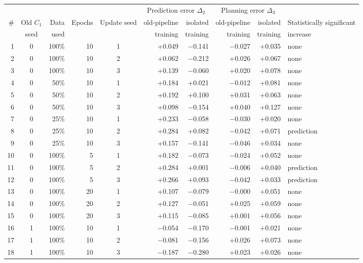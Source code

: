 \documentclass[10pt,a4paper]{article}
\newcommand{\Y}{\cellcolor{red!15}}
\begin{document}
\small
\begin{tabular}{rcrrcrrrrl}\toprule
 & & & & & \multicolumn{2}{c}{Prediction error $\Delta_2$} & \multicolumn{2}{c}{Planning error $\Delta_3$} & \\
\cmidrule(lr){6-7}\cmidrule(lr){8-9}
\# & Old $C_1$ & Data & Epochs & Update seed & old-pipeline & isolated & old-pipeline & isolated & Statistically significant\\
 & seed & used & & & training & training & training & training & increase\\\midrule
1 & 0 & 100\% & 10 & 1 & +0.049 & $-$0.141 & $-$0.027 & \Y +0.035 & none\\
2 & 0 & 100\% & 10 & 2 & +0.062 & $-$0.212 & \Y +0.026 & \Y +0.067 & none\\
3 & 0 & 100\% & 10 & 3 & \Y +0.139 & $-$0.060 & \Y +0.020 & \Y +0.078 & none\\
4 & 0 & 50\% & 10 & 1 & \Y +0.184 & +0.021 & $-$0.012 & \Y +0.081 & none\\
5 & 0 & 50\% & 10 & 2 & \Y +0.192 & +0.100 & \Y +0.031 & \Y +0.063 & none\\
6 & 0 & 50\% & 10 & 3 & +0.098 & $-$0.154 & \Y +0.040 & \Y +0.127 & none\\
7 & 0 & 25\% & 10 & 1 & \Y +0.233 & $-$0.058 & $-$0.030 & \Y +0.020 & none\\
8 & 0 & 25\% & 10 & 2 & \Y +0.284 & +0.082 & $-$0.042 & \Y +0.071 & prediction\\
9 & 0 & 25\% & 10 & 3 & \Y +0.157 & $-$0.141 & $-$0.046 & \Y +0.034 & none\\
10 & 0 & 100\% & 5 & 1 & \Y +0.182 & $-$0.073 & $-$0.024 & \Y +0.052 & none\\
11 & 0 & 100\% & 5 & 2 & \Y +0.284 & +0.001 & $-$0.006 & \Y +0.040 & prediction\\
12 & 0 & 100\% & 5 & 3 & \Y +0.266 & +0.093 & $-$0.042 & \Y +0.033 & prediction\\
13 & 0 & 100\% & 20 & 1 & +0.107 & $-$0.079 & $-$0.000 & \Y +0.051 & none\\
14 & 0 & 100\% & 20 & 2 & \Y +0.127 & $-$0.051 & \Y +0.025 & \Y +0.059 & none\\
15 & 0 & 100\% & 20 & 3 & \Y +0.115 & $-$0.085 & +0.001 & \Y +0.056 & none\\
\midrule
16 & 1 & 100\% & 10 & 1 & $-$0.054 & $-$0.170 & $-$0.001 & \Y +0.021 & none\\
17 & 1 & 100\% & 10 & 2 & $-$0.081 & $-$0.156 & \Y +0.026 & \Y +0.073 & none\\
18 & 1 & 100\% & 10 & 3 & $-$0.187 & $-$0.280 & \Y +0.023 & \Y +0.026 & none\\

\end{tabular}
\end{document}
